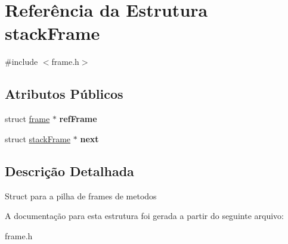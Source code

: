 \hypertarget{structstackFrame}{\section{Referência da Estrutura stack\-Frame}
\label{structstackFrame}
}


{\ttfamily \#include $<$frame.\-h$>$}

\subsection*{Atributos Públicos}
\begin{DoxyCompactItemize}
\item 
\hypertarget{structstackFrame_ac37e8750f94dd789e68064103a552b2a}{struct \hyperlink{structframe}{frame} $\ast$ {\bfseries ref\-Frame}}\label{structstackFrame_ac37e8750f94dd789e68064103a552b2a}

\item 
\hypertarget{structstackFrame_ae23c22c5fd9960b731bc85ed04c0580d}{struct \hyperlink{structstackFrame}{stack\-Frame} $\ast$ {\bfseries next}}\label{structstackFrame_ae23c22c5fd9960b731bc85ed04c0580d}

\end{DoxyCompactItemize}


\subsection{Descrição Detalhada}
Struct para a pilha de frames de metodos 

A documentação para esta estrutura foi gerada a partir do seguinte arquivo\-:\begin{DoxyCompactItemize}
\item 
frame.\-h\end{DoxyCompactItemize}
